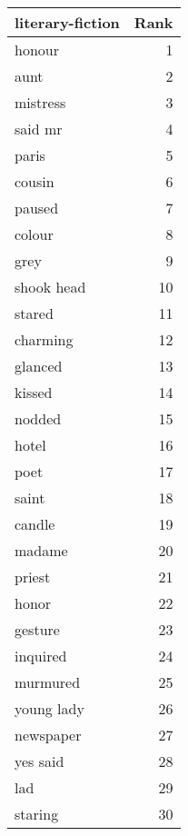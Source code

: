 \begin{table}
\label{tab:literary-fiction_terms}
\begin{tabular}{lr}
\toprule
literary-fiction & Rank \\
\midrule
honour & 1 \\
aunt & 2 \\
mistress & 3 \\
said mr & 4 \\
paris & 5 \\
cousin & 6 \\
paused & 7 \\
colour & 8 \\
grey & 9 \\
shook head & 10 \\
stared & 11 \\
charming & 12 \\
glanced & 13 \\
kissed & 14 \\
nodded & 15 \\
hotel & 16 \\
poet & 17 \\
saint & 18 \\
candle & 19 \\
madame & 20 \\
priest & 21 \\
honor & 22 \\
gesture & 23 \\
inquired & 24 \\
murmured & 25 \\
young lady & 26 \\
newspaper & 27 \\
yes said & 28 \\
lad & 29 \\
staring & 30 \\
\bottomrule
\end{tabular}
\end{table}
